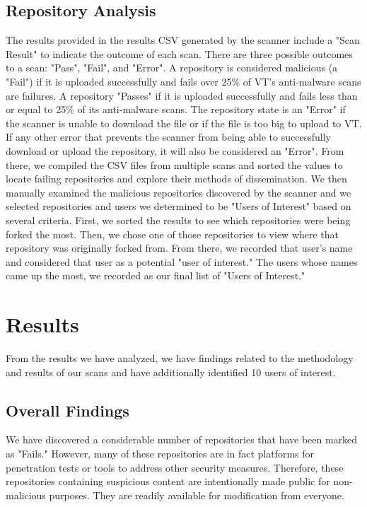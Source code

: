 \documentclass[]{acmart}
\begin{document}
\subsection{Repository Analysis}
The results provided in the results CSV generated by the scanner include a "Scan Result" to indicate the outcome of each scan. There are three possible outcomes to a scan: "Pass", "Fail", and "Error". A repository is considered malicious (a "Fail") if it is uploaded successfully and fails over 25\% of VT's anti-malware scans are failures. A repository "Passes" if it is uploaded successfully and fails less than or equal to 25\% of its anti-malware scans. The repository state is an "Error" if the scanner is unable to download the file or if the file is too big to upload to VT. If any other error that prevents the scanner from being able to successfully download or upload the repository, it will also be considered an "Error". From there, we compiled the CSV files from multiple scans and sorted the values to locate failing repositories and explore their methods of dissemination. We then manually examined the malicious repositories discovered by the scanner and we selected repositories and users we determined to be "Users of Interest" based on several criteria. First, we sorted the results to see which repositories were being forked the most. Then, we chose one of those repositories to view where that repository was originally forked from. From there, we recorded that user's name and considered that user as a potential "user of interest." The users whose names came up the most, we recorded as our final list of "Users of Interest."

\section{Results}
From the results we have analyzed, we have findings related to the methodology and results of our scans and have additionally identified 10 users of interest.

\subsection{Overall Findings}
We have discovered a considerable number of repositories that have been marked as "Fails." However, many of these repositories are in fact platforms for penetration tests or tools to address other security measures. Therefore, these repositories containing suspicious content are intentionally made public for non-malicious purposes. They are readily available for modification from everyone. 
\end{document}
